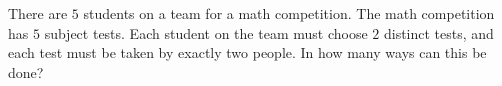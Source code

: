 There are $5$ students on a team for a math competition. The math competition has $5$ subject tests. Each student on the team must choose $2$ distinct tests, and each test must be taken by exactly two people. In how many ways can this be done?